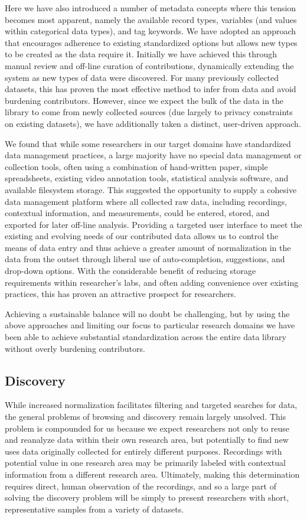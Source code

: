 \documentclass{sig-alternate}
\begin{document}
Here we have also introduced a number of metadata concepts where this tension becomes most apparent, namely the available record types, variables (and values within categorical data types), and tag keywords.
We have adopted an approach that encourages adherence to existing standardized options but  allows new types to be created as the data require it.
Initially we have achieved this through manual review and off-line curation of contributions, dynamically extending the system as new types of data were discovered.
For many previously collected datasets, this has proven the most effective method to infer from data and avoid burdening contributors.
However, since we expect the bulk of the data in the library to come from newly collected sources (due largely to privacy constraints on existing datasets), we have additionally taken a distinct, user-driven approach.

We found that while some researchers in our target domains have standardized data management practices, a large majority have no special data management or collection tools, often using a combination of hand-written paper, simple spreadsheets, existing video annotation tools, statistical analysis software, and available filesystem storage.
This suggested the opportunity to supply a cohesive data management platform where all collected raw data, including recordings, contextual information, and measurements, could be entered, stored, and exported for later off-line analysis.
Providing a targeted user interface to meet the existing and evolving needs of our contributed data allows us to control the means of data entry and thus achieve a greater amount of normalization in the data from the outset through liberal use of auto-completion, suggestions, and drop-down options.
With the considerable benefit of reducing storage requirements within researcher's labs, and often adding convenience over existing practices, this has proven an attractive prospect for researchers.

Achieving a sustainable balance will no doubt be challenging, but by using the above approaches and limiting our focus to particular research domains we have been able to achieve substantial standardization across the entire data library without overly burdening contributors.

\subsection{Discovery}

While increased normalization facilitates filtering and targeted searches for data, the general problems of browsing and discovery remain largely unsolved.
This problem is compounded for us because we expect researchers not only to reuse and reanalyze data within their own research area, but potentially to find new uses data originally collected for entirely different purposes.
Recordings with potential value in one research area may be primarily labeled with contextual information from a different research area.
Ultimately, making this determination requires direct, human observation of the recordings, and so a large part of solving the discovery problem will be simply to present researchers with short, representative samples from a variety of datasets.
\end{document}
